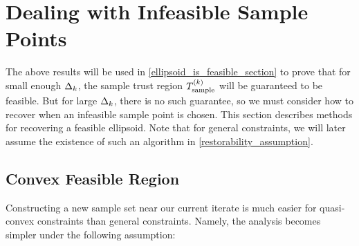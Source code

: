 \section{Dealing with Infeasible Sample Points}
\label{recovering_feasiblity_section}

The above results will be used in \cref{ellipsoid_is_feasible_section} to prove that for small enough $\Delta_k$, 
the sample trust region ${T_{\text{sample}}^{(k)}}$ will be guaranteed to be feasible.
But for large $\Delta_k$, there is no such guarantee, so we must consider how to recover when an infeasible sample point is chosen.
This section describes methods for recovering a feasible ellipsoid.
Note that for general constraints, we will later assume the existence of such an algorithm in \cref{restorability_assumption}.

\subsection{Convex Feasible Region}
\label{convex_restoration}
%

Constructing a new sample set near our current iterate is much easier for quasi-convex constraints than general constraints.
Namely, the analysis becomes simpler under the following assumption:


